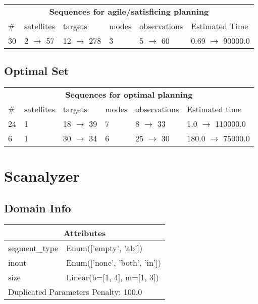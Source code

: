 \documentclass{article}
\begin{document}
                        \begin{center}
                        \begin{tabular}{l|l|l|l|l|l}
                        \multicolumn{6}{c}{\bf \large Sequences for agile/satisficing planning}\\
                        \# & satellites & targets & modes & observations & Estimated Time\\\midrule
                        30&2 $\rightarrow$ 57&12 $\rightarrow$ 278&3&5 $\rightarrow$ 60&0.69 $\rightarrow$ 90000.0
                        \end{tabular}
                        \end{center}
                    
                            \subsection*{Optimal Set}

                            \begin{center}
                            \begin{tabular}{l|l|l|l|l|l}
                            \multicolumn{6}{c}{\bf \large Sequences for optimal planning}\\
                            \# & satellites & targets & modes & observations & Estimated time\\\midrule
                            24&1&18 $\rightarrow$ 39&7&8 $\rightarrow$ 33&1.0 $\rightarrow$ 110000.0\\
6&1&30 $\rightarrow$ 34&6&25 $\rightarrow$ 30&180.0 $\rightarrow$ 75000.0
                            \end{tabular}
                            \end{center}
                    \newpage \section{Scanalyzer}
                    \subsection*{Domain Info}

                    \begin{center}
                    \begin{tabular}{p{}p{}}
                    \multicolumn{2}{c}{\bf \large Attributes}\\\midrule
                    segment\_type & Enum(['empty', 'ab'])\\
inout & Enum(['none', 'both', 'in'])\\
size & Linear(b=[1, 4], m=[1, 3])
                    
                     \\\midrule
                    \multicolumn{2}{l}{Duplicated Parameters Penalty: 100.0}
                    \end{tabular}
                    \end{center}
                
\end{document}
